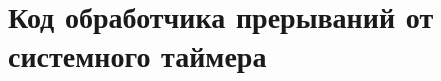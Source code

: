 \chapter{Код обработчика прерываний от системного таймера}

\renewcommand{\ttdefault}{cmtt}


\newpage